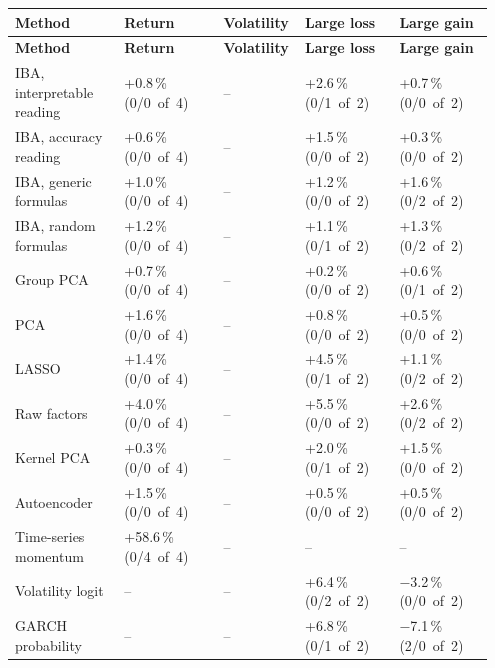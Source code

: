 {\scriptsize\setlength{\tabcolsep}{4pt}\renewcommand{\arraystretch}{1.2}
\begin{longtable}{@{}>{\raggedright\arraybackslash}p{0.223\linewidth}>{\raggedright\arraybackslash}p{0.204\linewidth}>{\raggedright\arraybackslash}p{0.133\linewidth}>{\raggedright\arraybackslash}p{0.193\linewidth}>{\raggedright\arraybackslash}p{0.193\linewidth}@{}}
\toprule
\textbf{Method} & \textbf{Return} & \textbf{Volatility} & \textbf{Large loss} & \textbf{Large gain} \\
\midrule
\endfirsthead
\toprule
\textbf{Method} & \textbf{Return} & \textbf{Volatility} & \textbf{Large loss} & \textbf{Large gain} \\
\midrule
\endhead
\bottomrule
\endlastfoot
IBA, interpretable reading & +0.8\,\% (0/0~of~4) & -- & +2.6\,\% (0/1~of~2) & +0.7\,\% (0/0~of~2) \\
IBA, accuracy reading & +0.6\,\% (0/0~of~4) & -- & +1.5\,\% (0/0~of~2) & +0.3\,\% (0/0~of~2) \\
IBA, generic formulas & +1.0\,\% (0/0~of~4) & -- & +1.2\,\% (0/0~of~2) & +1.6\,\% (0/2~of~2) \\
IBA, random formulas & +1.2\,\% (0/0~of~4) & -- & +1.1\,\% (0/1~of~2) & +1.3\,\% (0/2~of~2) \\
Group PCA & +0.7\,\% (0/0~of~4) & -- & +0.2\,\% (0/0~of~2) & +0.6\,\% (0/1~of~2) \\
PCA & +1.6\,\% (0/0~of~4) & -- & +0.8\,\% (0/0~of~2) & +0.5\,\% (0/0~of~2) \\
LASSO & +1.4\,\% (0/0~of~4) & -- & +4.5\,\% (0/1~of~2) & +1.1\,\% (0/2~of~2) \\
Raw factors & +4.0\,\% (0/0~of~4) & -- & +5.5\,\% (0/0~of~2) & +2.6\,\% (0/2~of~2) \\
Kernel PCA & +0.3\,\% (0/0~of~4) & -- & +2.0\,\% (0/1~of~2) & +1.5\,\% (0/0~of~2) \\
Autoencoder & +1.5\,\% (0/0~of~4) & -- & +0.5\,\% (0/0~of~2) & +0.5\,\% (0/0~of~2) \\
Time-series momentum & +58.6\,\% (0/4~of~4) & -- & -- & -- \\
Volatility logit & -- & -- & +6.4\,\% (0/2~of~2) & \ensuremath{-}3.2\,\% (0/0~of~2) \\
GARCH probability & -- & -- & +6.8\,\% (0/1~of~2) & \ensuremath{-}7.1\,\% (2/0~of~2) \\
\end{longtable}}
\addtocounter{table}{-1}
